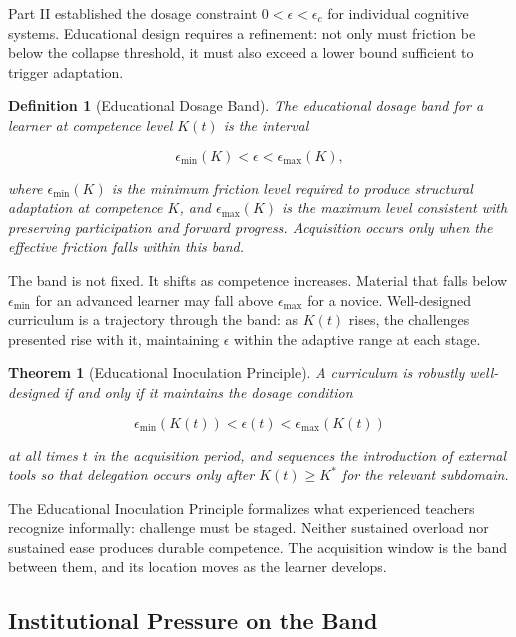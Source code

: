 \documentclass[11pt]{article}
\newtheorem{theorem}{Theorem}
\newtheorem{definition}{Definition}
\theoremstyle{remark}
\begin{document}
Part II established the dosage constraint $0 < \epsilon < \epsilon_c$ for individual cognitive systems. Educational design requires a refinement: not only must friction be below the collapse threshold, it must also exceed a lower bound sufficient to trigger adaptation.

\begin{definition}[Educational Dosage Band]
\label{def:dosage_band}
The educational dosage band for a learner at competence level $K(t)$ is the interval

\[
\epsilon_{\min}(K) < \epsilon < \epsilon_{\max}(K),
\]

where $\epsilon_{\min}(K)$ is the minimum friction level required to produce structural adaptation at competence $K$, and $\epsilon_{\max}(K)$ is the maximum level consistent with preserving participation and forward progress. Acquisition occurs only when the effective friction falls within this band.
\end{definition}

The band is not fixed. It shifts as competence increases. Material that falls below $\epsilon_{\min}$ for an advanced learner may fall above $\epsilon_{\max}$ for a novice. Well-designed curriculum is a trajectory through the band: as $K(t)$ rises, the challenges presented rise with it, maintaining $\epsilon$ within the adaptive range at each stage.

\begin{theorem}[Educational Inoculation Principle]
\label{thm:eip}
A curriculum is robustly well-designed if and only if it maintains the dosage condition

\[
\epsilon_{\min}(K(t)) < \epsilon(t) < \epsilon_{\max}(K(t))
\]

at all times $t$ in the acquisition period, and sequences the introduction of external tools so that delegation occurs only after $K(t) \geq K^*$ for the relevant subdomain.
\end{theorem}

The Educational Inoculation Principle formalizes what experienced teachers recognize informally: challenge must be staged. Neither sustained overload nor sustained ease produces durable competence. The acquisition window is the band between them, and its location moves as the learner develops.

\subsection{Institutional Pressure on the Band}
\end{document}
